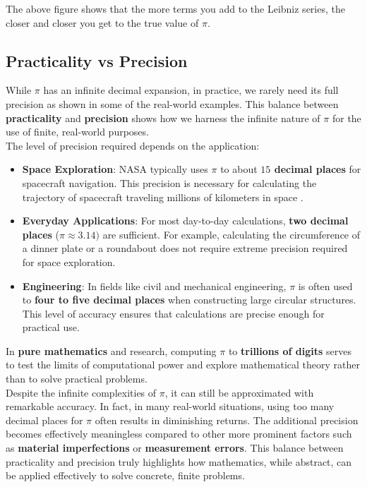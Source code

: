 \documentclass[12pt]{article}
\begin{document}
\noindent The above figure shows that the more terms you add to the Leibniz series, the closer and closer you get to the true value of $\pi$.

\subsection{Practicality vs Precision}
While $\pi$ has an infinite decimal expansion, in practice, we rarely need its full precision as shown in some of the real-world examples. This balance between \textbf{practicality} and \textbf{precision} shows how we harness the infinite nature of $\pi$ for the use of finite, real-world purposes.\\

\noindent The level of precision required depends on the application:

\begin{itemize}
    \item \textbf{Space Exploration}: NASA typically uses $\pi$ to about \textbf{$15$ decimal places} for spacecraft navigation. This precision is necessary for calculating the trajectory of spacecraft traveling millions of kilometers in space \cite{nasa_pi}.
    \item \textbf{Everyday Applications}: For most day-to-day calculations, \textbf{two decimal places} ($\pi \approx 3.14)$ are sufficient. For example, calculating the circumference of a dinner plate or a roundabout does not require extreme precision required for space exploration.
    \item \textbf{Engineering}: In fields like civil and mechanical engineering, $\pi$ is often used to \textbf{four to five decimal places} when constructing large circular structures. This level of accuracy ensures that calculations are precise enough for practical use.
\end{itemize}

\noindent In \textbf{pure mathematics} and research, computing $\pi$ to \textbf{trillions of digits} serves to test the limits of computational power and explore mathematical theory rather than to solve practical problems.\\

\noindent Despite the infinite complexities of $\pi$, it can still be approximated with remarkable accuracy. In fact, in many real-world situations, using too many decimal places for $\pi$ often results in diminishing returns. The additional precision becomes effectively meaningless compared to other more prominent factors such as \textbf{material imperfections} or \textbf{measurement errors}. This balance between practicality and precision truly highlights how mathematics, while abstract, can be applied effectively to solve concrete, finite problems. 
\end{document}
